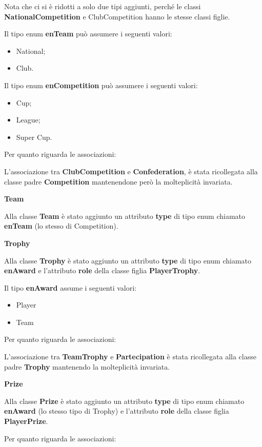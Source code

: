 Nota che ci si è ridotti a solo due tipi aggiunti, perché le 
classi \textbf{NationalCompetition} e {ClubCompetition} hanno 
le stesse classi figlie.

Il tipo enum \textbf{enTeam} può assumere i seguenti valori:
\begin{itemize}
	\item National;
	\item Club.
\end{itemize}

Il tipo enum \textbf{enCompetition} può assumere i seguenti 
valori:
\begin{itemize}
	\item Cup;
	\item League;
	\item Super Cup.
\end{itemize}
Per quanto riguarda le associazioni:

L'associazione tra \textbf{ClubCompetition} e 
\textbf{Confederation}, è stata ricollegata alla classe padre 
\textbf{Competition} mantenendone però la molteplicità 
invariata.

\bigskip
\textbf{Team}
\bigskip

Alla classe \textbf{Team} è stato aggiunto un attributo 
\textbf{type} di tipo enum chiamato \textbf{enTeam} (lo 
stesso di Competition).

\bigskip
\textbf{Trophy}
\bigskip

Alla classe \textbf{Trophy} è stato aggiunto un attributo 
\textbf{type} di tipo enum chiamato \textbf{enAward} e l'attributo
\textbf{role} della classe figlia \textbf{PlayerTrophy}.

Il tipo \textbf{enAward} assume i seguenti valori:
\begin{itemize}
	\item Player
	\item Team
\end{itemize}
Per quanto riguarda le associazioni:

L'associazione tra \textbf{TeamTrophy} e 
\textbf{Partecipation} è stata ricollegata alla classe padre 
\textbf{Trophy} mantenendo la molteplicità invariata.


\bigskip
\textbf{Prize}
\bigskip

Alla classe \textbf{Prize} è stato aggiunto un attributo 
\textbf{type} di tipo enum chiamato \textbf{enAward} (lo 
stesso tipo di Trophy) e l'attributo
\textbf{role} della classe figlia \textbf{PlayerPrize}.

Per quanto riguarda le associazioni:

